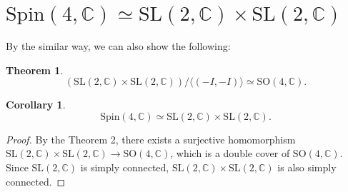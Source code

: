 \documentclass{article}
\newtheorem{theorem}{Theorem}
\newtheorem{corollary}{Corollary}
\newcommand{\SO}{\mathrm{SO}}
\newcommand{\SL}{\mathrm{SL}}
\newcommand{\Spin}{\mathrm{Spin}}
\begin{document}
\section{$\Spin(4, \mathbb{C})\simeq \SL(2, \mathbb{C})\times \SL(2, \mathbb{C})$}
By the similar way, we can also show the following:
\begin{theorem}
$$
(\SL(2, \mathbb{C})\times\SL(2, \mathbb{C})) / \langle (-I, -I)\rangle \simeq \SO(4, \mathbb{C}). 
$$
\end{theorem}
\begin{corollary}
$$\Spin(4, \mathbb{C})\simeq \SL(2, \mathbb{C})\times \SL(2, \mathbb{C}).$$ 
\end{corollary}
\begin{proof}
By the Theorem 2, there exists a surjective homomorphism $\SL(2, \mathbb{C})\times \SL(2, \mathbb{C})\to \SO(4, \mathbb{C})$, which is a double cover of $\SO(4, \mathbb{C})$. Since $\SL(2, \mathbb{C})$ is simply connected, $\SL(2, \mathbb{C})\times \SL(2, \mathbb{C})$ is also simply connected. 
\end{proof}
\end{document}
